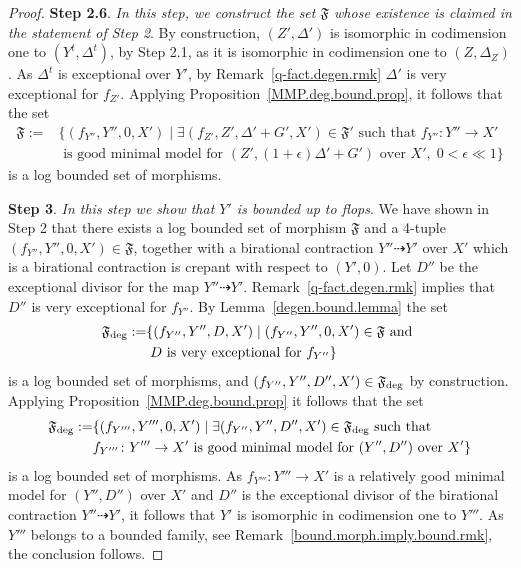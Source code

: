 \documentclass[11pt]{ip-journal}
\theoremstyle{definition}
\begin{document}
\begin{proof}
\medskip

{\bf Step 2.6}. {\it In this step, we construct the set $\mathfrak F$ whose existence is claimed in the statement of Step 2}.
\newline
By construction, $(Z', \Delta')$ is isomorphic in codimension one to $(Y^t, \Delta^t)$, by Step 2.1, as it is isomorphic in codimension one to $(Z, \Delta_Z)$. 
As $\Delta^t$ is exceptional over $Y'$, by Remark~\ref{q-fact.degen.rmk} $\Delta'$ is very exceptional for $f_{Z'}$.
Applying Proposition~\ref{MMP.deg.bound.prop}, it follows that the set 
\begin{align*}
    \mathfrak{F}:= &
    \{(f_{Y''}, Y'', 0, X')\;\vert \; \exists (f_{Z'}, Z', \Delta'+G', X') \in \mathfrak{F}' \textrm{ such that } f_{Y''} \colon Y'' \to X' \\
    & \textrm{ is good minimal model for } (Z', (1+\epsilon)\Delta'+G') \textrm{ over } X', \; 0< \epsilon \ll 1\}
\end{align*}
is a log bounded set of morphisms. 

\medskip

{\bf Step 3}. 
{\it In this step we show that $Y'$ is bounded up to flops}.
\newline
We have shown in Step 2 that there exists a log bounded set of morphism $\mathfrak F$ and a 4-tuple $(f_{Y''}, Y'', 0, X') \in \mathfrak F$, together with a birational contraction $Y'' \dashrightarrow Y'$ over $X'$ which is a birational contraction is crepant with respect to $(Y', 0)$.
\newline
Let $D''$ be the exceptional divisor for the map $Y'' \dashrightarrow Y'$.
Remark~\ref{q-fact.degen.rmk} implies that $D''$ is very exceptional for $f_{Y''}$.
By Lemma~\ref{degen.bound.lemma} the set 
\begin{align*}
    \mathfrak{F}_{\rm deg}:=
    & \{(f_{Y''}, Y'', D, X')\;\vert \; (f_{Y''}, Y'', 0, X') \in \mathfrak{F} \textrm{ and }
    \\
    & \; D \textrm{ is very exceptional for } f_{Y''}\}
\end{align*}
is a log bounded set of morphisms, and $(f_{Y''}, Y'', D'', X') \in \mathfrak{F}_{\rm deg}$ by construction. 
Applying Proposition~\ref{MMP.deg.bound.prop} it follows that the set 
\begin{align*}
    \mathfrak{F}_{\rm deg}:= &
    \{(f_{Y'''}, Y''', 0, X')\;\vert \; \exists (f_{Y''}, Y'', D'', X') \in \mathfrak{F}_{\rm deg} \textrm{ such that } \\
    & f_{Y'''} \colon Y''' \to X' \textrm{ is good minimal model for } (Y'', D'') \textrm{ over } X'\}
\end{align*}
is a log bounded set of morphisms.
As $f_{Y'''} \colon Y''' \to X'$ is a relatively good minimal model for $(Y'', D'')$ over $X'$ and $D''$ is the exceptional divisor of the birational contraction $Y'' \dashrightarrow Y'$, it follows that $Y'$ is isomorphic in codimension one to $Y'''$. 
As $Y'''$ belongs to a bounded family, see Remark~\ref{bound.morph.imply.bound.rmk}, the conclusion follows.
\end{proof}
\end{document}
